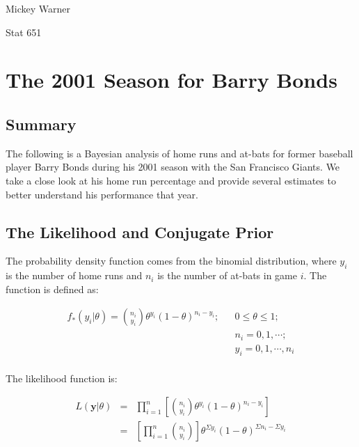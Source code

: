 \documentclass[12pt]{article}
\begin{document}
\noindent Mickey Warner

\noindent Stat 651
\bigskip

\section{The 2001 Season for Barry Bonds}

\subsection{Summary}

\noindent The following is a Bayesian analysis of home runs and at-bats for former baseball player Barry Bonds during his 2001 season with the San Francisco Giants.  We take a close look at his home run percentage and provide several estimates to better understand his performance that year.

\subsection{The Likelihood and Conjugate Prior}

The probability density function comes from the binomial distribution, where $y_i$ is the number of home runs and $n_i$ is the number of at-bats in game $i$.  The function is defined as:


\begin{eqnarray*}
f_*(y_i|\theta)={n_i \choose y_i}\theta^{y_i}(1-\theta)^{n_i-y_i}; && 0\leq\theta\leq1; \\
&& n_i=0,1,\cdots; \\
&& y_i=0,1,\cdots,n_i \\
\end{eqnarray*}

\noindent The likelihood function is:

\begin{eqnarray*}
L(\mathbf{y}|\theta) &=& \prod_{i=1}^n\left[{n_i \choose y_i}\theta^{y_i}(1-\theta)^{n_i-y_i}\right] \\
&=& \left[\prod_{i=1}^n{n_i \choose y_i}\right]\theta^{\Sigma y_i}(1-\theta)^{\Sigma n_i-\Sigma y_i} \\
\end{eqnarray*}
\end{document}
